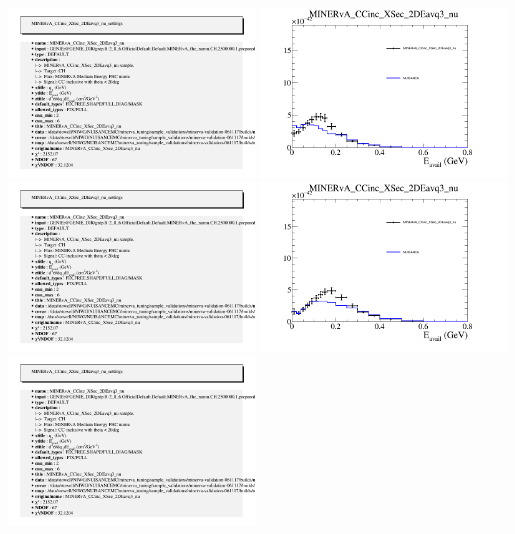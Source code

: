 \documentclass{article}
\begin{document}
\includegraphics[width=0.49\textwidth]{figures/nuisance_MINERvA_CCinc_XSec_2DEavq3_nu_info.png}
\centering
\includegraphics[width=0.49\textwidth]{figures/nuisance_MINERvA_CCinc_XSec_2DEavq3_nu_slice_3_comp.png}
\includegraphics[width=0.49\textwidth]{figures/nuisance_MINERvA_CCinc_XSec_2DEavq3_nu_info.png}
\centering
\includegraphics[width=0.49\textwidth]{figures/nuisance_MINERvA_CCinc_XSec_2DEavq3_nu_slice_4_comp.png}
\includegraphics[width=0.49\textwidth]{figures/nuisance_MINERvA_CCinc_XSec_2DEavq3_nu_info.png}
\end{document}
